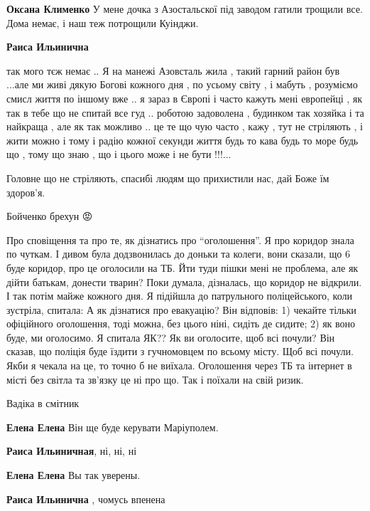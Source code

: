 \begin{itemize}
\textbf{Оксана Клименко} У мене дочка з Азостальскої під заводом гатили трощили все. Дома немає, і наш теж потрощили Куінджи.

\textbf{Раиса Ильинична} 

так мого тєж немає .. Я на манежі Азовсталь жила , такий гарний район був
...але ми живі дякую Богові кожного дня , по усьому світу , і мабуть ,
розуміємо смисл життя по іншому вже .. я зараз в Європі і часто кажуть мені
европейці , як так в тебе що не спитай все гуд .. роботою задоволена , будинком
так хозяйка і та найкраща , але як так можливо .. це те що чую часто , кажу ,
тут не стріляють , і жити можно і тому і радію кожної секунди життя будь то
кава будь то море будь що , тому що знаю , що і цього може і не бути !!!...


Головне що не стріляють, спасибі людям що прихистили нас, дай Боже їм здоров'я.

\end{itemize} %


Бойченко брехун 😡


Про сповіщення та про те, як дізнатись про \enquote{оголошення}. Я про коридор знала по
чуткам. І дивом була додзвонилась до доньки та колеги, вони сказали, що 6 буде
коридор, про це оголосили на ТБ. Йти туди пішки мені не проблема, але як дійти
батькам, донести тварин? Поки думала, дізналась, що коридор не відкрили. І так
потім майже кожного дня. Я підійшла до патрульного поліцейського, коли
зустріла, спитала: А як дізнатися про евакуацію? Він відповів: 1) чекайте
тільки офіційного оголошення, тоді можна, без цього ніні, сидіть де сидите; 2)
як воно буде, ми оголосимо. Я спитала ЯК?? Як ви оголосите, щоб всі почули? Він
сказав, що поліція буде їздити з гучномовцем по всьому місту. Щоб всі почули.
Якби я чекала на це, то точно б не виїхала. Оголошення через ТБ та інтернет в
місті без світла та зв'язку це ні про що. Так і поїхали на свій ризик.


Вадіка в смітник

\begin{itemize} %
\textbf{Елена Елена} Він ще буде керувати Маріуполем.

\textbf{Раиса Ильиничная}, ні, ні, ні

\textbf{Елена Елена} Вы так уверены.

\textbf{Раиса Ильинична} , чомусь впенена
\end{itemize} %

